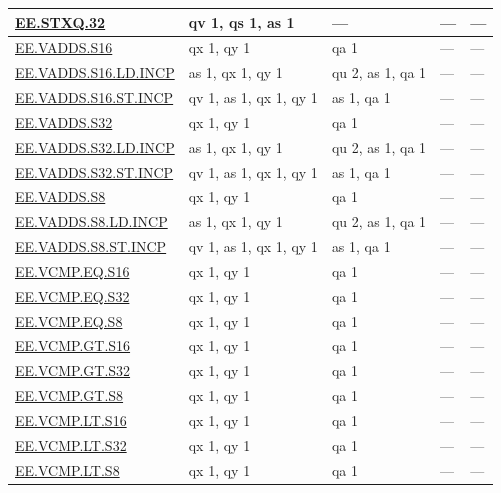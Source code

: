 \begin{longtable}[c]{|l|m{2.5cm}|m{2.5cm}|m{2.5cm}|m{2.5cm}|}
    \hyperref[instruction:EESTXQ32]{EE.STXQ.32} & qv 1, qs 1, as 1 & — & — & — \\\hline
    \hyperref[instruction:EEVADDSS16]{EE.VADDS.S16} & qx 1, qy 1 & qa 1 & — & — \\\hline
    \hyperref[instruction:EEVADDSS16LDINCP]{EE.VADDS.S16.LD.INCP} & as 1, qx 1, qy 1 & qu 2, as 1, qa 1 & — & — \\\hline
    \hyperref[instruction:EEVADDSS16STINCP]{EE.VADDS.S16.ST.INCP} & qv 1, as 1, qx 1, qy 1 & as 1, qa 1 & — & — \\\hline
    \hyperref[instruction:EEVADDSS32]{EE.VADDS.S32} & qx 1, qy 1 & qa 1 & — & — \\\hline
    \hyperref[instruction:EEVADDSS32LDINCP]{EE.VADDS.S32.LD.INCP} & as 1, qx 1, qy 1 & qu 2, as 1, qa 1 & — & — \\\hline
    \hyperref[instruction:EEVADDSS32STINCP]{EE.VADDS.S32.ST.INCP} & qv 1, as 1, qx 1, qy 1 & as 1, qa 1 & — & — \\\hline
    \hyperref[instruction:EEVADDSS8]{EE.VADDS.S8} & qx 1, qy 1 & qa 1 & — & — \\\hline
    \hyperref[instruction:EEVADDSS8LDINCP]{EE.VADDS.S8.LD.INCP} & as 1, qx 1, qy 1 & qu 2, as 1, qa 1 & — & — \\\hline
    \hyperref[instruction:EEVADDSS8STINCP]{EE.VADDS.S8.ST.INCP} & qv 1, as 1, qx 1, qy 1 & as 1, qa 1 & — & — \\\hline
    \hyperref[instruction:EEVCMPEQS16]{EE.VCMP.EQ.S16} & qx 1, qy 1 & qa 1 & — & — \\\hline
    \hyperref[instruction:EEVCMPEQS32]{EE.VCMP.EQ.S32} & qx 1, qy 1 & qa 1 & — & — \\\hline
    \hyperref[instruction:EEVCMPEQS8]{EE.VCMP.EQ.S8} & qx 1, qy 1 & qa 1 & — & — \\\hline
    \hyperref[instruction:EEVCMPGTS16]{EE.VCMP.GT.S16} & qx 1, qy 1 & qa 1 & — & — \\\hline
    \hyperref[instruction:EEVCMPGTS32]{EE.VCMP.GT.S32} & qx 1, qy 1 & qa 1 & — & — \\\hline
    \hyperref[instruction:EEVCMPGTS8]{EE.VCMP.GT.S8} & qx 1, qy 1 & qa 1 & — & — \\\hline
    \hyperref[instruction:EEVCMPLTS16]{EE.VCMP.LT.S16} & qx 1, qy 1 & qa 1 & — & — \\\hline
    \hyperref[instruction:EEVCMPLTS32]{EE.VCMP.LT.S32} & qx 1, qy 1 & qa 1 & — & — \\\hline
    \hyperref[instruction:EEVCMPLTS8]{EE.VCMP.LT.S8} & qx 1, qy 1 & qa 1 & — & — \\\hline

\end{longtable}

